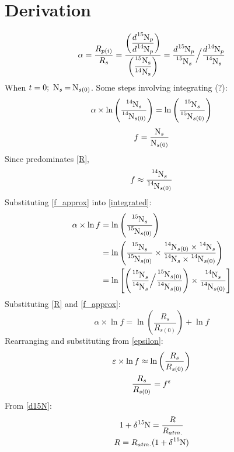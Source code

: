 \section{Derivation}
\begin{equation}
    \alpha=\dfrac{R_{p(i)}}{R_s}=\frac{\left(\dfrac{d\ce{^{15}N_p}}{d\ce{^{14}N_p}}\right)}{\left(\ce{\dfrac{^{15}N_s}{^{14}N_s}}\right)}=\frac{d\ce{^{15}N_p}}{\ce{^{15}N_s}}\Big/\frac{d\ce{^{14}N_p}}{\ce{^{14}N_s}}\label{alpha/R}
\end{equation}
When $t=0;\ \ce{N_s = N_{s(0)}}$. Some steps involving integrating (?):
\begin{equation}
    \alpha \times \ln{\left(\frac{\ce{^{14}N_s}}{\ce{^{14}N_{s(0)}}}\right)}=\ln{\left(\frac{\ce{^{15}N_s}}{\ce{^{15}N_{s(0)}}}\right)}\label{integrated}
\end{equation}
\begin{equation}
    f = \ce{\frac{N_s}{N_{s(0)}}}\label{f}
\end{equation}
Since  predominates \eqref{R},
\begin{equation}
    f \approx \ce{\frac{^{14}N_s}{^{14}N_{s(0)}}}\label{f_approx}
\end{equation}
Substituting \eqref{f_approx} into \eqref{integrated}:
\begin{align*}
    \alpha \times \ln{f} &=\ln{\left(\frac{\ce{^{15}N_s}}{\ce{^{15}N_{s(0)}}}\right)}\\
    &=\ln{\left(\frac{\ce{^{15}N_s}}{\ce{^{15}N_{s(0)}}}\times\frac{\ce{^{14}N_{s(0)}\times^{14}N_s}}{\ce{^{14}N_s\times^{14}N_{s(0)}}}\right)}\\
    &=\ln{\left[\left(\ce{\frac{^{15}N_s}{^{14}N_s}}\Big/\ce{\frac{^{15}N_{s(0)}}{^{14}N_{s(0)}}}\right)\times\ce{\frac{^{14}N_s}{^{14}N_{s(0)}}}\right]}
\end{align*}
Substituting \eqref{R} and \eqref{f_approx}:
\begin{equation}
    \alpha \times \ln{f} = \ln{\left(\frac{R_s}{R_{s(0)}}\right)}+\ln{f}
\end{equation}
Rearranging and substituting from \eqref{epsilon}:
\begin{gather}
    \varepsilon \times \ln{f} \approx \ln{\left(\frac{R_s}{R_{s(0)}}\right)}\label{epsilon*lnf}\\
    \frac{R_s}{R_{s(0)}}=f^\varepsilon
\end{gather}
From \eqref{d15N}:
\begin{gather}
1+\delta\ce{^{15}N}=\frac{R}{R_{atm.}}\nonumber\\
R=R_{atm.}(1+\delta\ce{^{15}N})
\end{gather}
